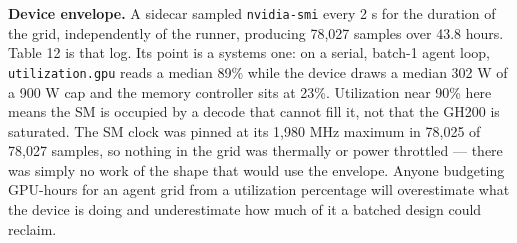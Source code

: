 \documentclass[
  10pt,
  a4paper,
]{article}
\let\oldtexttt\texttt
\renewcommand{\texttt}[1]{{\small\oldtexttt{#1}}}
\begin{document}
\textbf{Device envelope.} A sidecar sampled \texttt{nvidia-smi} every 2
s for the duration of the grid, independently of the runner, producing
78,027 samples over 43.8 hours. Table 12 is that log. Its point is a
systems one: on a serial, batch-1 agent loop, \texttt{utilization.gpu}
reads a median 89\% while the device draws a median 302 W of a 900 W cap
and the memory controller sits at 23\%. Utilization near 90\% here means
the SM is occupied by a decode that cannot fill it, not that the GH200
is saturated. The SM clock was pinned at its 1,980 MHz maximum in 78,025
of 78,027 samples, so nothing in the grid was thermally or power
throttled --- there was simply no work of the shape that would use the
envelope. Anyone budgeting GPU-hours for an agent grid from a
utilization percentage will overestimate what the device is doing and
underestimate how much of it a batched design could reclaim.
\end{document}

